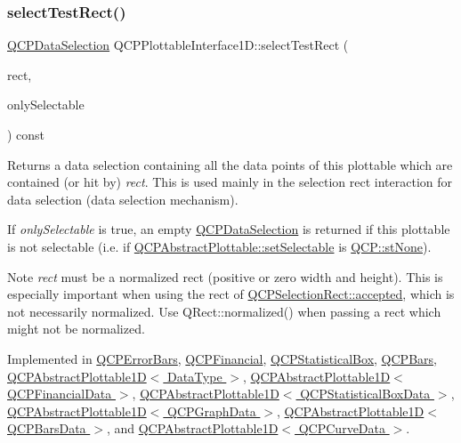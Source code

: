 \subsubsection{\texorpdfstring{select\+Test\+Rect()}{selectTestRect()}}
{\footnotesize\ttfamily \hyperlink{class_q_c_p_data_selection}{Q\+C\+P\+Data\+Selection} Q\+C\+P\+Plottable\+Interface1\+D\+::select\+Test\+Rect (\begin{DoxyParamCaption}\item[{const Q\+RectF \&}]{rect,  }\item[{bool}]{only\+Selectable }\end{DoxyParamCaption}) const\hspace{0.3cm}{\ttfamily [pure virtual]}}

Returns a data selection containing all the data points of this plottable which are contained (or hit by) {\itshape rect}. This is used mainly in the selection rect interaction for data selection (data selection mechanism).

If {\itshape only\+Selectable} is true, an empty \hyperlink{class_q_c_p_data_selection}{Q\+C\+P\+Data\+Selection} is returned if this plottable is not selectable (i.\+e. if \hyperlink{class_q_c_p_abstract_plottable_ac238d6e910f976f1f30d41c2bca44ac3}{Q\+C\+P\+Abstract\+Plottable\+::set\+Selectable} is \hyperlink{namespace_q_c_p_ac6cb9db26a564b27feda362a438db038aa64628e338a2dd1e6f0dc84dec0b63fe}{Q\+C\+P\+::st\+None}).

\begin{DoxyNote}{Note}
{\itshape rect} must be a normalized rect (positive or zero width and height). This is especially important when using the rect of \hyperlink{class_q_c_p_selection_rect_a15a43542e1f7b953a44c260b419e6d2c}{Q\+C\+P\+Selection\+Rect\+::accepted}, which is not necessarily normalized. Use {\ttfamily Q\+Rect\+::normalized()} when passing a rect which might not be normalized. 
\end{DoxyNote}


Implemented in \hyperlink{class_q_c_p_error_bars_ac32f9e729cb205ca56821f9b663472c0}{Q\+C\+P\+Error\+Bars}, \hyperlink{class_q_c_p_financial_a3c5beb1ab028a1dba845fc9dcffc7cf4}{Q\+C\+P\+Financial}, \hyperlink{class_q_c_p_statistical_box_a42febad6ad5e924a151434cc434b4ffc}{Q\+C\+P\+Statistical\+Box}, \hyperlink{class_q_c_p_bars_ab03bb6125c3e983b89d694f75ce6b3d5}{Q\+C\+P\+Bars}, \hyperlink{class_q_c_p_abstract_plottable1_d_ac385c38a79e419ed3600c2ee398fd216}{Q\+C\+P\+Abstract\+Plottable1\+D$<$ Data\+Type $>$}, \hyperlink{class_q_c_p_abstract_plottable1_d_ac385c38a79e419ed3600c2ee398fd216}{Q\+C\+P\+Abstract\+Plottable1\+D$<$ Q\+C\+P\+Financial\+Data $>$}, \hyperlink{class_q_c_p_abstract_plottable1_d_ac385c38a79e419ed3600c2ee398fd216}{Q\+C\+P\+Abstract\+Plottable1\+D$<$ Q\+C\+P\+Statistical\+Box\+Data $>$}, \hyperlink{class_q_c_p_abstract_plottable1_d_ac385c38a79e419ed3600c2ee398fd216}{Q\+C\+P\+Abstract\+Plottable1\+D$<$ Q\+C\+P\+Graph\+Data $>$}, \hyperlink{class_q_c_p_abstract_plottable1_d_ac385c38a79e419ed3600c2ee398fd216}{Q\+C\+P\+Abstract\+Plottable1\+D$<$ Q\+C\+P\+Bars\+Data $>$}, and \hyperlink{class_q_c_p_abstract_plottable1_d_ac385c38a79e419ed3600c2ee398fd216}{Q\+C\+P\+Abstract\+Plottable1\+D$<$ Q\+C\+P\+Curve\+Data $>$}.

